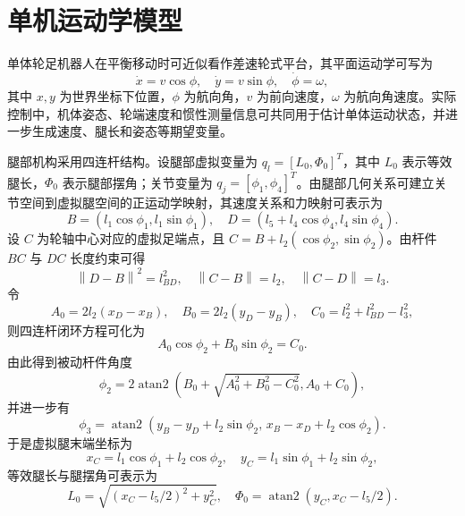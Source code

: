 \documentclass[type=bachelor]{bithesis}
\begin{document}
\section{单机运动学模型}
单体轮足机器人在平衡移动时可近似看作差速轮式平台，其平面运动学可写为
\begin{equation}
  \dot{x}=v\cos\phi,\quad
  \dot{y}=v\sin\phi,\quad
  \dot{\phi}=\omega ,
\end{equation}
其中 $x,y$ 为世界坐标下位置，$\phi$ 为航向角，$v$ 为前向速度，$\omega$ 为航向角速度。实际控制中，机体姿态、轮端速度和惯性测量信息可共同用于估计单体运动状态，并进一步生成速度、腿长和姿态等期望变量。

腿部机构采用四连杆结构。设腿部虚拟变量为 $q_l=[L_0,\Phi_0]^T$，其中 $L_0$ 表示等效腿长，$\Phi_0$ 表示腿部摆角；关节变量为 $q_j=[\phi_1,\phi_4]^T$。由腿部几何关系可建立关节空间到虚拟腿空间的正运动学映射，其速度关系和力映射可表示为
\begin{equation}
  B=(l_1\cos\phi_1,l_1\sin\phi_1),\quad
  D=(l_5+l_4\cos\phi_4,l_4\sin\phi_4).
\end{equation}
设 $C$ 为轮轴中心对应的虚拟足端点，且 $C=B+l_2(\cos\phi_2,\sin\phi_2)$。由杆件 $BC$ 与 $DC$ 长度约束可得
\begin{equation}
  \left\|D-B\right\|^2=l_{BD}^2,\quad
  \left\|C-B\right\|=l_2,\quad
  \left\|C-D\right\|=l_3 .
\end{equation}
令
\begin{equation}
  A_0=2l_2(x_D-x_B),\quad
  B_0=2l_2(y_D-y_B),\quad
  C_0=l_2^2+l_{BD}^2-l_3^2 ,
\end{equation}
则四连杆闭环方程可化为
\begin{equation}
  A_0\cos\phi_2+B_0\sin\phi_2=C_0 .
\end{equation}
由此得到被动杆件角度
\begin{equation}
  \phi_2
  =2\operatorname{atan2}
  \left(B_0+\sqrt{A_0^2+B_0^2-C_0^2},A_0+C_0\right),
\end{equation}
并进一步有
\begin{equation}
  \phi_3=\operatorname{atan2}
  \left(y_B-y_D+l_2\sin\phi_2,\,
  x_B-x_D+l_2\cos\phi_2\right).
\end{equation}
于是虚拟腿末端坐标为
\begin{equation}
  x_C=l_1\cos\phi_1+l_2\cos\phi_2,\quad
  y_C=l_1\sin\phi_1+l_2\sin\phi_2 ,
\end{equation}
等效腿长与腿摆角可表示为
\begin{equation}
  L_0=\sqrt{(x_C-l_5/2)^2+y_C^2},\quad
  \Phi_0=\operatorname{atan2}(y_C,x_C-l_5/2).
\end{equation}
\end{document}
